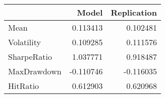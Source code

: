 \begin{tabular}{lrr}
\toprule
{} &     Model &  Replication \\
\midrule
Mean        &  0.113413 &     0.102481 \\
Volatility  &  0.109285 &     0.111576 \\
SharpeRatio &  1.037771 &     0.918487 \\
MaxDrawdown & -0.110746 &    -0.116035 \\
HitRatio    &  0.612903 &     0.620968 \\
\bottomrule
\end{tabular}

